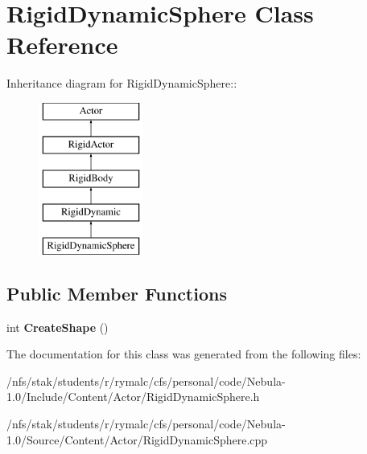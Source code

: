 \hypertarget{classRigidDynamicSphere}{
\section{RigidDynamicSphere Class Reference}
\label{classRigidDynamicSphere}
}
Inheritance diagram for RigidDynamicSphere::\begin{figure}[H]
\begin{center}
\leavevmode
\includegraphics[height=5cm]{classRigidDynamicSphere}
\end{center}
\end{figure}
\subsection*{Public Member Functions}
\begin{DoxyCompactItemize}
\item 
\hypertarget{classRigidDynamicSphere_a3980aac316eea866672576b9e463d0b0}{
int {\bfseries CreateShape} ()}
\label{classRigidDynamicSphere_a3980aac316eea866672576b9e463d0b0}

\end{DoxyCompactItemize}


The documentation for this class was generated from the following files:\begin{DoxyCompactItemize}
\item 
/nfs/stak/students/r/rymalc/cfs/personal/code/Nebula-\/1.0/Include/Content/Actor/RigidDynamicSphere.h\item 
/nfs/stak/students/r/rymalc/cfs/personal/code/Nebula-\/1.0/Source/Content/Actor/RigidDynamicSphere.cpp\end{DoxyCompactItemize}
